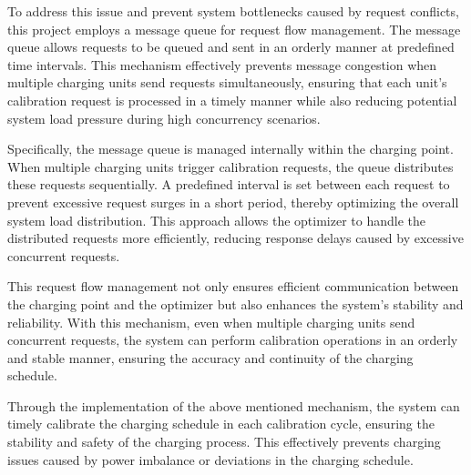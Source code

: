 \documentclass[
english,
ruledheaders=section,%
class=report,%
thesis={type=Report},%
accentcolor=9c,%
custommargins=true,%
marginpar=false,%
parskip=half-,%
fontsize=11pt,%
logofile={img/tuda_logo.pdf}, %
]{tudapub}
\begin{document}
    To address this issue and prevent system bottlenecks caused by request conflicts, this project employs a message queue for request flow management. The message queue allows requests to be queued and sent in an orderly manner at predefined time intervals. This mechanism effectively prevents message congestion when multiple charging units send requests simultaneously, ensuring that each unit's calibration request is processed in a timely manner while also reducing potential system load pressure during high concurrency scenarios.


    Specifically, the message queue is managed internally within the charging point. When multiple charging units trigger calibration requests, the queue distributes these requests sequentially. A predefined interval is set between each request to prevent excessive request surges in a short period, thereby optimizing the overall system load distribution. This approach allows the optimizer to handle the distributed requests more efficiently, reducing response delays caused by excessive concurrent requests.


    This request flow management not only ensures efficient communication between the charging point and the optimizer but also enhances the system's stability and reliability. With this mechanism, even when multiple charging units send concurrent requests, the system can perform calibration operations in an orderly and stable manner, ensuring the accuracy and continuity of the charging schedule.


    Through the implementation of the above mentioned mechanism, the system can timely calibrate the charging schedule in each calibration cycle, ensuring the stability and safety of the charging process. This effectively prevents charging issues caused by power imbalance or deviations in the charging schedule.
\end{document}
